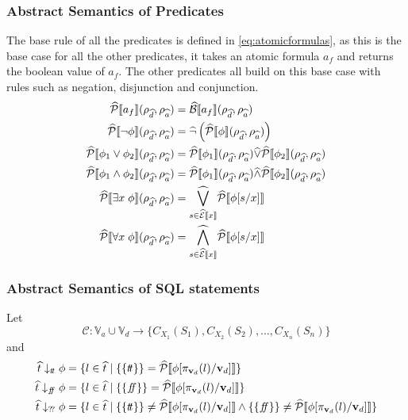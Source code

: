 \subsubsection{Abstract Semantics of Predicates}
The base rule of all the predicates is defined in \autoref{eq:atomicformulas}, as this is the base case for all the other predicates, it takes an atomic formula $a_f$ and returns the boolean value of $a_f$.
The other predicates all build on this base case with rules such as negation, disjunction and conjunction.
\begin{align}
    \abspredsem{a_f}(\rho_{\ab{d}}, \rho_{\ab{a}}) &= \absboolsem{a_f}(\rho_{\ab{d}}, \rho_{\ab{a}}) \\ \label{eq:atomicformulas}
    \abspredsem{\neg \phi}(\rho_{\ab{d}}, \rho_{\ab{a}}) &= \ab{\neg} \left( \abspredsem{\phi}(\rho_{\ab{d}}, \rho_{\ab{a}}) \right) \\
    \abspredsem{\phi_1 \lor \phi_2}(\rho_{\ab{d}}, \rho_{\ab{a}}) &= \abspredsem{\phi_1}(\rho_{\ab{d}}, \rho_{\ab{a}}) \ab{\lor} \abspredsem{\phi_2}(\rho_{\ab{d}}, \rho_{\ab{a}}) \\
    \abspredsem{\phi_1 \land \phi_2}(\rho_{\ab{d}}, \rho_{\ab{a}}) &= \abspredsem{\phi_1}(\rho_{\ab{d}}, \rho_{\ab{a}}) \ab{\land} \abspredsem{\phi_2}(\rho_{\ab{d}}, \rho_{\ab{a}}) \\
    \abspredsem{\exists x \; \phi}(\rho_{\ab{d}}, \rho_{\ab{a}}) &= \underset{s \in \absexpsem{x}}{\ab{\bigvee}} \abspredsem{\phi[s/x]} \\
    \abspredsem{\forall x \; \phi}(\rho_{\ab{d}}, \rho_{\ab{a}}) &= \underset{s \in \absexpsem{x}}{\ab{\bigwedge}} \abspredsem{\phi[s/x]}
\end{align}

\subsubsection{Abstract Semantics of SQL statements}

Let
\begin{equation}
    \mathcal{C} : \mathbb{V}_a \cup \mathbb{V}_d \rightarrow \{ C_{X_1}(S_1), C_{X_2}(S_2), \dots, C_{X_n}(S_n) \}
\end{equation}
and
\begin{align}
    \abstable \downarrow_{\true} \phi &= \{ l \in \ab{t} \mid \{\{ \true \}\} = \abspredsem{\phi[\pi_{\mathbf{v}_d}(l)/\mathbf{v}_d]} \} \\
    \abstable \downarrow_{\false} \phi &= \{ l \in \ab{t} \mid \{\{ \false \}\} = \abspredsem{\phi[\pi_{\mathbf{v}_d}(l)/\mathbf{v}_d]} \} \\
    \abstable \downarrow_{\unknown} \phi &= \{ l \in \ab{t} \mid \{\{ \true \}\} \neq \abspredsem{\phi[\pi_{\mathbf{v}_d}(l)/\mathbf{v}_d]} \land \{\{ \false \}\} \neq \abspredsem{\phi[\pi_{\mathbf{v}_d}(l)/\mathbf{v}_d]}\} \\
\end{align}

